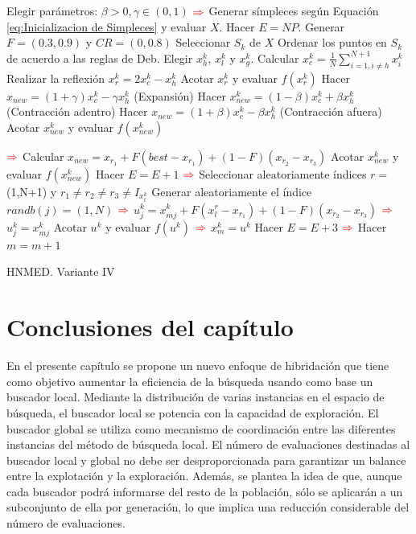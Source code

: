 \begin{algorithm}
	\begin{algorithmic}[1]
		\STATE Elegir parámetros: $\beta>0, \gamma \in (0,1)$
		\STATE $\color{red} \Rightarrow $ Generar símpleces según Equación \ref{eq:Inicializacion de Simpleces} y evaluar $X$.
		\STATE Hacer $E=NP$.
		\STATE Generar $F=(0.3,0.9)$ y $CR=(0,0.8)$
		\STATE Seleccionar $S_k$ de $X$
		\STATE Ordenar los puntos en $S_k$ de acuerdo a las reglas de Deb.
		\STATE Elegir $x^k_h$, $x^k_l$ y $x^k_g$.
		\STATE Calcular $x^k_c=\frac{1}{N} \sum_{i=1, i\neq h }^{N+1} x^k_i$
		\STATE Realizar la reflexión $x^k_r=2x^k_c -x^k_h$
		\STATE Acotar  $x^k_r$ y evaluar  $f(x^k_r)$
		\STATE Hacer $x_{new}=(1+\gamma)x^k_c-\gamma x^k_h$ (Expansión)
		\ELSE {}
		\STATE Hacer $x^k_{new}=(1-\beta)x^k_c+\beta x^k_h$ (Contracción adentro)
		\ENDIF
		\ELSE {}
		\STATE Hacer $x_{new}=(1+\beta)x^k_c-\beta x^k_h$ (Contracción afuera)
		\ENDIF
		\ENDIF
		\STATE Acotar $x^k_{new}$ y evaluar $f(x^k_{new})$
		
		
		\STATE $\color{red} \Rightarrow $  Calcular  $x_{new}= x_{r_1}+F(best-x_{r_1})+(1-F)(x_{r_2}-x_{r_3})$
		\STATE Acotar  $x^k_{new}$ y evaluar  $f(x^k_{new})$  
		\STATE Hacer  $E=E+1$ 
		\ENDIF
		\STATE $\color{red} \Rightarrow $ Seleccionar aleatoriamente índices $r=$(1,N+1) y $r_1 \neq r_2 \neq r_3 \neq I_{x^k_l} $
		\STATE Generar aleatoriamente el índice $randb(j)=(1,N)$ 
		\STATE $\color{red} \Rightarrow $ $u^k_{j} =  x^k_{mj}+F(x^r_l-x_{r_1})+(1-F)(x_{r_2}-x_{r_3})$
		\ELSE 
		\STATE $\color{red} \Rightarrow $ $u^k_{j} = x^k_{mj}$
		\ENDIF
		\ENDFOR
		\STATE Acotar $u^k$ y evaluar $f(u^k)$
		\STATE $\color{red} \Rightarrow $ $x^k_m = u^k$
		\ENDIF
		\STATE Hacer  $E=E+3$
		\ENDFOR
		\STATE $\color{red} \Rightarrow $ Hacer  $m=m+1$
		\ENDWHILE
	\end{algorithmic}
	\caption{HNMED. Variante IV}\label{alg:HNMEDV6}
\end{algorithm}
\section{Conclusiones del capítulo}
En el presente capítulo se propone un nuevo enfoque de hibridación que tiene como objetivo aumentar la eficiencia de la búsqueda usando como base un buscador local. Mediante la distribución de varias instancias en el espacio de búsqueda, el buscador local se potencia  con la capacidad de exploración. El buscador global se utiliza como mecanismo de coordinación entre las diferentes instancias del método de búsqueda local. El número de evaluaciones destinadas al buscador local y global no debe ser desproporcionada para garantizar un balance entre la explotación y la exploración. Además, se plantea la idea de que, aunque cada buscador podrá informarse del resto de la población, sólo se aplicarán a un subconjunto de ella por generación, lo que implica una reducción considerable del número de evaluaciones.

